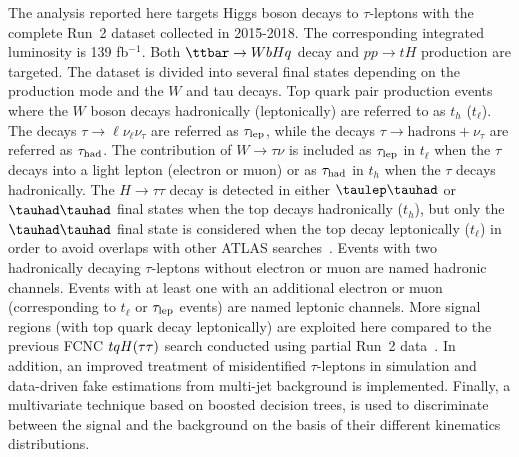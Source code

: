 \documentclass[PAPER, coverpage, atlasdraft=true, texlive=2016, UKenglish]{\ATLASLATEXPATH atlasdoc} %
\begin{document}

The analysis reported here targets Higgs boson decays to 
$\tau$-leptons with the complete Run~2 dataset collected in 2015-2018. The corresponding integrated luminosity is 139 fb$^{-1}$. Both $\ttbar \to WbHq$ decay and $pp \to tH$ production are targeted. The dataset is divided into several final states depending on the production mode and
the  $W$ and tau decays. Top quark pair production events where the $W$ boson decays hadronically (leptonically) are referred to as $t_h$ ($t_{\ell}$).
The decays $\tau \to \ell \nu_{\ell} \nu_{\tau}$ are referred as $\tau_{\mathrm{lep}}$, while the decays $\tau \to \text{hadrons} + \nu_{\tau}$ are referred as $\tau_\text{had}$.
The contribution of 
$W\rightarrow\tau\nu$ is included as $\tau_{\mathrm{lep}}$ in $t_{\ell}$ when the $\tau$ decays into a light lepton (electron or muon) or as $\tau_\text{had}$ 
in $t_h$ when the $\tau$ decays hadronically.
The $H\rightarrow \tau\tau$ decay is detected in
either $\tlhad$ or $\thadhad$ final states when the top decays hadronically ($t_h$), but only the $\thadhad$ final state is considered
when the top decay leptonically ($t_{\ell}$) in order to avoid overlaps with
other ATLAS searches~\cite{Aaboud:2018pob}. 
Events with two hadronically decaying $\tau$-leptons without electron or muon are named hadronic channels. Events with at least one \tauhad with an additional electron or muon (corresponding to $t_{\ell}$ or $\tau_{\mathrm{lep}}$ events) are named leptonic channels. More signal regions (with top quark decay leptonically) are exploited here compared to the previous FCNC $tqH(\tau\tau)$ search conducted using partial Run~2 data~\cite{fcnc36}.
In addition, an improved treatment of misidentified $\tau$-leptons in simulation and data-driven
fake estimations from multi-jet background is implemented.
Finally, a multivariate technique based on boosted decision trees, is used to discriminate between the signal and the background on the basis of their different kinematics distributions. 
\end{document}
